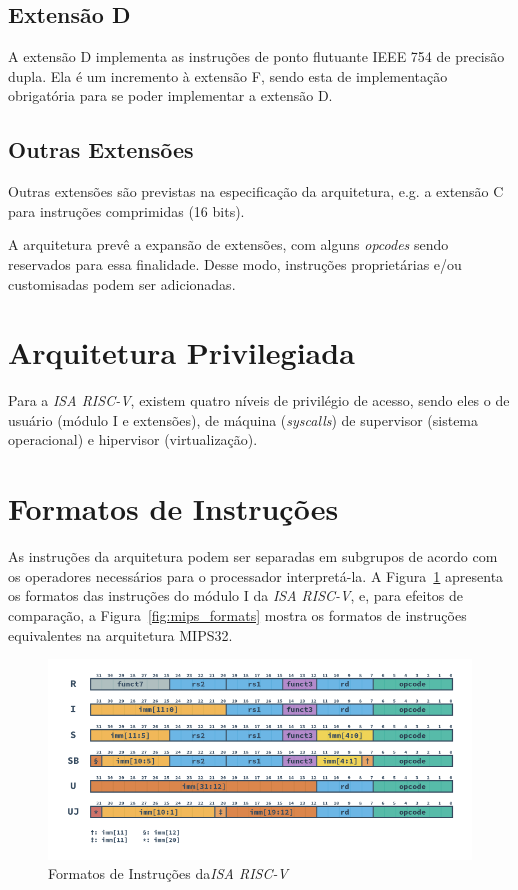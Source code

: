     \subsection{Extensão D}
    {
        A extensão D implementa as instruções de ponto flutuante IEEE 754 de
        precisão dupla. Ela é um incremento à extensão F, sendo esta de
        implementação obrigatória para se poder implementar a extensão D.
    }

    \subsection{Outras Extensões}
    {
        Outras extensões são previstas na especificação da arquitetura, e.g.
        a extensão C para instruções comprimidas (16 bits).
    }

    {
        A arquitetura prevê a expansão de extensões, com alguns
        \textit{opcodes} sendo reservados para essa finalidade. Desse modo,
        instruções proprietárias e/ou customisadas podem ser adicionadas.
    }

\section{Arquitetura Privilegiada}
{
    Para a \textit{ISA RISC-V}, existem quatro níveis de privilégio de acesso,
    sendo eles o de usuário (módulo I e extensões), de máquina 
    (\textit{syscalls}) de supervisor (sistema operacional) e hipervisor
    (virtualização).
}

\section{Formatos de Instruções}
{
    As instruções da arquitetura podem ser separadas em subgrupos de acordo com
    os operadores necessários para o processador interpretá-la. A 
    Figura~\ref{fig:riscv_formats} apresenta os formatos das instruções do
    módulo I da \textit{ISA RISC-V}, e, para efeitos de comparação, a
    Figura~\ref{fig:mips_formats} mostra os formatos de instruções equivalentes
    na arquitetura MIPS32.
}

\begin{figure}[H]
\centering
    \includegraphics[width=1\linewidth]{images/RV_Formats.png}
    \caption{Formatos de Instruções da\textit{ISA RISC-V}
        }\label{fig:riscv_formats}
\end{figure}

